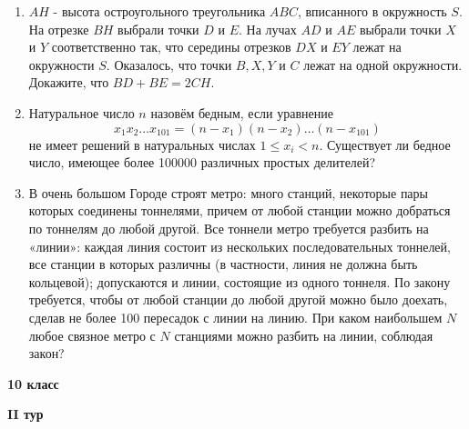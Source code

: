 \documentclass{article}
\begin{document}
\begin{enumerate}[label*=\textbf{\arabic{enumi}.}]
        \newpage

        \item $AH$ - высота остроугольного треугольника $ABC$, вписанного в окружность $S$.
        На отрезке $BH$ выбрали точки $D$ и $E$.
        На лучах $AD$ и $AE$ выбрали точки $X$ и $Y$ соответственно так, что середины отрезков $DX$ и $EY$ лежат на окружности $S$.
        Оказалось, что точки $B, X, Y$ и $C$ лежат на одной окружности.
        Докажите, что $BD + BE = 2CH.$

        \item Натуральное число $n$ назовём бедным, если уравнение
        \[x_1x_2\dotsc x_{101} = (n-x_1)(n-x_2)\dotsc (n-x_{101})\]
        не имеет решений в натуральных числах $1 \leqslant x_i < n$.
        Существует ли бедное число, имеющее более 100000 различных простых делителей?

        \item В очень большом Городе строят метро: много станций, некоторые пары которых соединены тоннелями, причем от любой станции можно добраться по тоннелям до любой другой.
        Все тоннели метро требуется разбить на «линии»: каждая линия состоит из нескольких последовательных тоннелей, все станции в которых различны (в частности, линия не должна быть кольцевой); допускаются и линии, состоящие из одного тоннеля.
        По закону требуется, чтобы от любой станции до любой другой можно было доехать, сделав не более 100 пересадок с линии на линию.
        При каком наибольшем $N$ любое связное метро с $N$ станциями можно разбить на линии, соблюдая закон?
    \end{enumerate}
    \newpage


    \begin{center}
        \LARGE\textbf{10 класс}
    \end{center}
    \begin{center}
        \large\textbf{II тур}
    \end{center}
\end{document}
